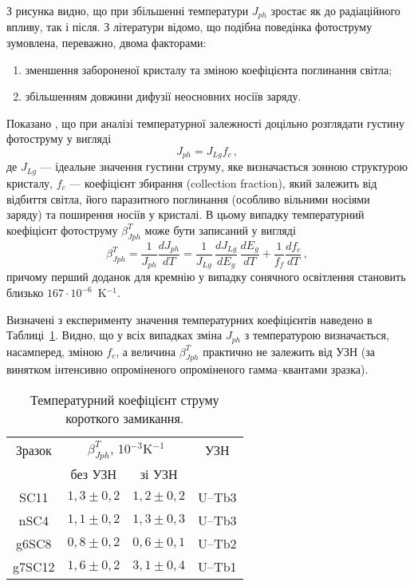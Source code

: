 З рисунка видно, що при збільшенні температури $J_{ph}$ зростає як до радіаційного впливу, так і після.
З літератури \cite{Faren,SCTemp:PP11,SCTemp:SEMSC140} відомо, що
подібна поведінка фотоструму зумовлена, переважно, двома факторами:
\begin{enumerate}[label=\arabic*),leftmargin=0em,itemindent=1.5em]
\item зменшення забороненої кристалу та зміною коефіцієнта поглинання світла;
\item збільшенням довжини дифузії неосновних носіїв заряду.
\end{enumerate}
Показано \cite{SCTemp:PP11,SCTemp:SEMSC140}, що при аналізі температурної залежності доцільно
розглядати густину фотоструму у вигляді
\begin{equation}
\label{eqIscIdeal}
J_{ph}=J_{Lg}f_c\,,
\end{equation}
де
$J_{Lg}$ --- ідеальне значення густини струму, яке визначається
зонною структурою кристалу,
$f_c$ --- коефіцієнт збирання (collection fraction),
який залежить від відбиття світла, його паразитного поглинання (особливо вільними носіями заряду)
та поширення носіїв у кристалі.
В цьому випадку температурний коефіцієнт фотоструму $\beta^T_{Jph}$ може бути записаний у вигляді
\begin{equation}
\label{eqIscTempKoef}
\beta^T_{Jph}=\frac{1}{J_{ph}}\frac{dJ_{ph}}{dT}=\frac{1}{J_{Lg}}\,\frac{dJ_{Lg}}{dE_g}\,\frac{dE_g}{dT}+\frac{1}{f_{f}}\frac{df_{c}}{dT}\,,
\end{equation}
причому перший доданок для кремнію у випадку сонячного освітлення становить близько $167\cdot10^{-6}$~K$^{-1}$.

Визначені з експерименту значення температурних коефіцієнтів наведено в Таблиці~\ref{tabIscT}.
Видно, що у всіх випадках зміна $J_{ph}$ з температурою визначається, насамперед,
зміною $f_c$, а величина $\beta^T_{Jph}$ практично не залежить від УЗН (за винятком інтенсивно опроміненого опроміненого гамма--квантами зразка).

\begin{table}
\caption{\label{tabIscT}Температурний коефіцієнт струму короткого замикання.
}
\center
\begin{tabular}{|c|c|c|c|}
\hline
Зразок&\multicolumn{2}{c|}{$\beta^T_{Jph}$, 10$^{-3}$K$^{-1}$}&УЗН\\ \cline{2-3}
&без УЗН & зі УЗН&\\ \hline
SC11&$1,3\pm0,2$&$1,2\pm0,2$&U--Tb3\\ \hline
nSC4&$1,1\pm0,2$&$1,3\pm0,3$&U--Tb3\\ \hline
g6SC8&$0,8\pm0,2$&$0,6\pm0,1$&U--Tb2\\ \hline
g7SC12&$1,6\pm0,2$&$3,1\pm0,4$&U--Tb1\\ \hline
\end{tabular}
\end{table}

